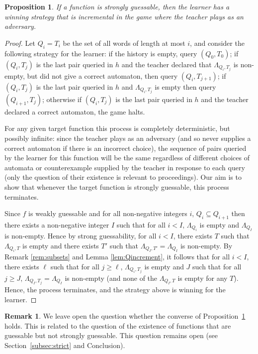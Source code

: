 \documentclass[10pt,a4paper]{amsart}
\newtheorem{prop}[thm]{Proposition}
\theoremstyle{definition}
\newtheorem{rem}[thm]{Remark}
\numberwithin{equation}{section}
\numberwithin{theorem}{section}
\begin{document}
\begin{prop}
\label{prop:game}If a function is strongly guessable, then the learner has a winning strategy that is incremental in the game where the teacher plays as an adversary.
\end{prop}

\begin{proof}
Let $Q_i = T_i$ be the set of all words of length at most $i$, and consider the following strategy for the learner: if the history is empty, query $(Q_0,T_0)$; if $(Q_i, T_j)$ is the last pair queried in $h$ and the teacher declared that $\Lambda_{Q_i,T_j}$ is non-empty, but did not give a correct automaton, then query $(Q_i, T_{j+1})$; if $(Q_i, T_j)$ is the last pair queried in $h$ and $\Lambda_{Q_i,T_j}$ is empty then query $(Q_{i+1}, T_{j})$; otherwise if $(Q_i, T_j)$ is the last pair queried in $h$ and the teacher declared a correct automaton, the game halts.

For any given target function this process is completely deterministic, but possibly infinite: since the teacher plays as an adversary (and so never supplies a correct automaton if there is an incorrect choice), the sequence of pairs queried by the learner for this function will be the same regardless of different choices of automata or counterexample supplied by the teacher in response to each query (only the question of their existence is relevant to proceedings). Our aim is to show that whenever the target function is strongly guessable, this process terminates. 

Since $f$ is weakly guessable and for all non-negative integers $i$, $Q_i \subseteq Q_{i+1}$ then there exists a non-negative integer $I$ such that for all $i< I$, $\Lambda_{Q_i}$ is empty and $\Lambda_{Q_I}$ is non-empty. Hence by strong guessability, for all $i< I$, there exists $T$ such that $\Lambda_{Q_i,T}$ is empty and there exists $T'$ such that $\Lambda_{Q_I,T'} = \Lambda_{Q_I}$ is non-empty. By Remark \ref{rem:subsets} and Lemma \ref{lem:Qincrement}, it follows that for all $i< I$, there exists $\ell$ such that for all $j\geq \ell$, $\Lambda_{Q_i,T_j}$ is empty and $J$ such that for all $j\geq J$, $\Lambda_{Q_I,T_j} = \Lambda_{Q_I}$ is non-empty (and none of the $\Lambda_{Q_I,T}$ is empty for any $T$).
Hence, the process terminates, and the strategy above is winning for the learner.
\end{proof}

\begin{rem}
We leave open the question whether the converse of Proposition~\ref{prop:game} holds. This is related to the question of the existence of functions that are guessable but not strongly guessable. This question remains open (see Section~\ref{subsec:strict} and Conclusion).
\end{rem}
\end{document}

